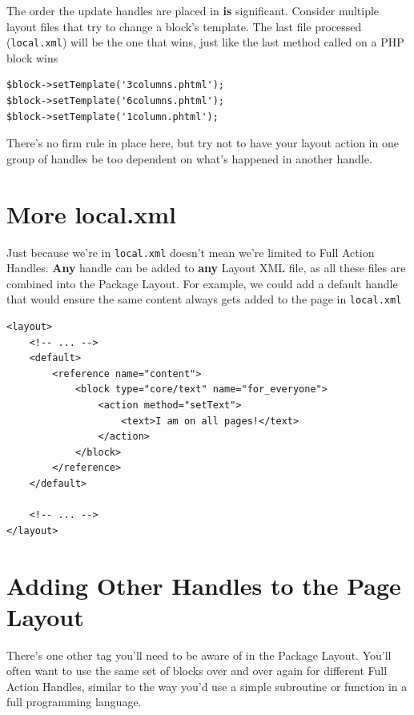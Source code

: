 \documentclass[oneside]{book}
\begin{document}
The order the update handles are placed in \textbf{is} significant. Consider multiple layout files that try to change a block's template.  The last file processed (\footnotesize\texttt{local.xml}\normalsize) will be the one that wins, just like the last method called on a PHP block wins

\begin{lstlisting}
$block->setTemplate('3columns.phtml');
$block->setTemplate('6columns.phtml');
$block->setTemplate('1column.phtml');

\end{lstlisting}


There's no firm rule in place here, but try not to have your layout action in one group of handles be too dependent on what's happened in another handle.

\section{More local.xml}

Just because we're in \footnotesize\texttt{local.xml} \normalsize  doesn't mean we're limited to Full Action Handles.  \textbf{Any} handle can be added to \textbf{any} Layout XML file, as all these files are combined into the Package Layout.  For example, we could add a default handle that would ensure the same content always gets added to the page in \footnotesize\texttt{local.xml} \normalsize

\begin{lstlisting}
<layout>
    <!-- ... -->
    <default>
        <reference name="content">
            <block type="core/text" name="for_everyone">
                <action method="setText">
                    <text>I am on all pages!</text>
                </action>
            </block>
        </reference>
    </default>

    <!-- ... -->
</layout>

\end{lstlisting}


\section{Adding Other Handles to the Page Layout}

There's one other tag you'll need to be aware of in the Package Layout.  You'll  often  want to use the same set of blocks over and over again for different Full Action Handles, similar to the way you'd use a simple subroutine or function in a full programming language.
\end{document}
